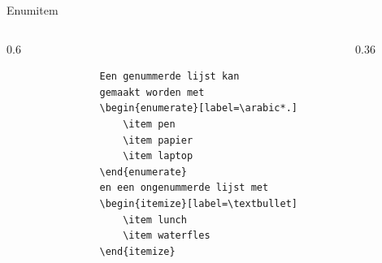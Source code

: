 \begin{frame}[fragile, t]{Enumitem}
	\begin{columns}[t]
		\begin{column}{0.6\textwidth}
			\begin{verbatim}
				Een genummerde lijst kan 
				gemaakt worden met
				\begin{enumerate}[label=\arabic*.]
					\item pen
					\item papier
					\item laptop
				\end{enumerate}
				en een ongenummerde lijst met
				\begin{itemize}[label=\textbullet]
					\item lunch
					\item waterfles
				\end{itemize}
			\end{verbatim}
			\par
		\end{column}
		
		\begin{column}{0.36\textwidth}
			\vspace{1mm}
		\end{column}
	\end{columns} 
\end{frame}

